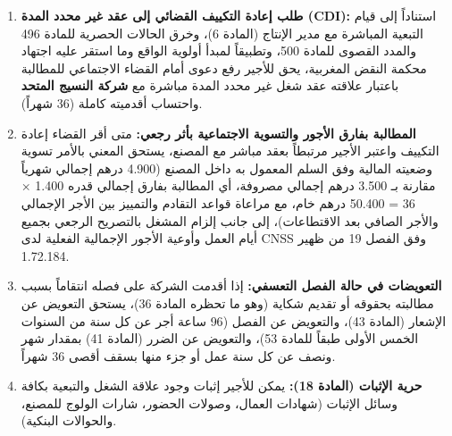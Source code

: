 \begin{enumerate}[leftmargin=*, itemsep=5pt]
    \item \textbf{طلب إعادة التكييف القضائي إلى عقد غير محدد المدة (\textenglish{CDI}):} استناداً إلى قيام التبعية المباشرة مع مدير الإنتاج (المادة \textenglish{6})، وخرق الحالات الحصرية للمادة \textenglish{496} والمدد القصوى للمادة \textenglish{500}، وتطبيقاً لمبدأ أولوية الواقع وما استقر عليه اجتهاد محكمة النقض المغربية، يحق للأجير رفع دعوى أمام القضاء الاجتماعي للمطالبة باعتبار علاقته عقد شغل غير محدد المدة مباشرة مع \textbf{شركة النسيج المتحد} واحتساب أقدميته كاملة (\textenglish{36} شهراً).
    \item \textbf{المطالبة بفارق الأجور والتسوية الاجتماعية بأثر رجعي:} متى أقر القضاء إعادة التكييف واعتبر الأجير مرتبطاً بعقد مباشر مع المصنع، يستحق المعني بالأمر تسوية وضعيته المالية وفق السلم المعمول به داخل المصنع (\textenglish{4.900} درهم إجمالي شهرياً مقارنة بـ \textenglish{3.500} درهم إجمالي مصروفة، أي المطالبة بفارق إجمالي قدره \textenglish{1.400} × \textenglish{36} = \textenglish{50.400} درهم خام، مع مراعاة قواعد التقادم والتمييز بين الأجر الإجمالي والأجر الصافي بعد الاقتطاعات)، إلى جانب إلزام المشغل بالتصريح الرجعي بجميع أيام العمل وأوعية الأجور الإجمالية الفعلية لدى \textenglish{CNSS} وفق الفصل \textenglish{19} من ظهير \textenglish{1.72.184}.
    \item \textbf{التعويضات في حالة الفصل التعسفي:} إذا أقدمت الشركة على فصله انتقاماً بسبب مطالبته بحقوقه أو تقديم شكاية (وهو ما تحظره المادة \textenglish{36})، يستحق التعويض عن الإشعار (المادة \textenglish{43})، والتعويض عن الفصل (\textenglish{96} ساعة أجر عن كل سنة من السنوات الخمس الأولى طبقاً للمادة \textenglish{53})، والتعويض عن الضرر (المادة \textenglish{41}) بمقدار شهر ونصف عن كل سنة عمل أو جزء منها بسقف أقصى \textenglish{36} شهراً.
    \item \textbf{حرية الإثبات (المادة \textenglish{18}):} يمكن للأجير إثبات وجود علاقة الشغل والتبعية بكافة وسائل الإثبات (شهادات العمال، وصولات الحضور، شارات الولوج للمصنع، والحوالات البنكية).
\end{enumerate}

